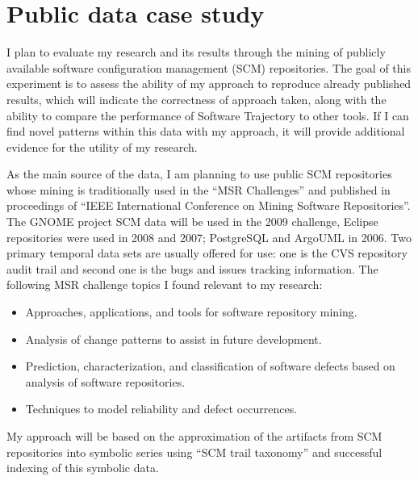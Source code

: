 \section{Public data case study}\label{public.evaluation}
I plan to evaluate my research and its results through the mining of publicly available software configuration management (SCM) repositories. The goal of this experiment is to assess the ability of my approach to reproduce already published results, which will indicate the correctness of approach taken, along with the ability to compare the performance of Software Trajectory to other tools. If I can find novel patterns within this data with my approach, it will provide additional evidence for the utility of my research.

As the main source of the data, I am planning to use public SCM repositories whose mining is traditionally used in the ``MSR Challenges'' \cite{citeulike:5043676} and published in proceedings of ``IEEE International Conference on Mining Software Repositories''. The GNOME project SCM data will be used in the 2009 challenge, Eclipse repositories were used in 2008 and 2007; PostgreSQL and ArgoUML in 2006. Two primary temporal data sets are usually offered for use: one is the CVS repository audit trail and second one is the bugs and issues tracking information. The following MSR challenge topics I found relevant to my research:
\begin{itemize}
  \item Approaches, applications, and tools for software repository mining.
  \item Analysis of change patterns to assist in future development.
	\item Prediction, characterization, and classification of software defects based on analysis of software repositories.
	\item Techniques to model reliability and defect occurrences.
\end{itemize}
My approach will be based on the approximation of the artifacts from SCM repositories into symbolic series using ``SCM trail taxonomy'' and successful indexing of this symbolic data. 

